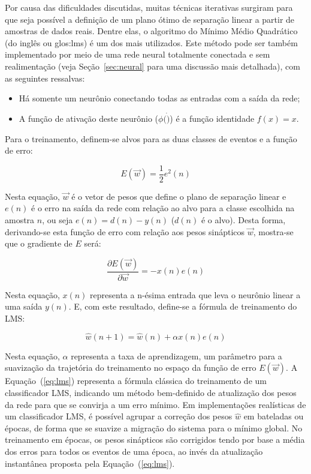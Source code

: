Por causa das dificuldades discutidas, muitas técnicas iterativas surgiram
para que seja possível a definição de um plano ótimo de separação linear a
partir de amostras de dados reais. Dentre elas, o algoritmo do Mínimo Médio
Quadrático \cite{widrow} (do inglês  ou \gls{glos:lms})
é um dos mais utilizados. Este método pode ser também implementado por meio de
uma rede neural totalmente conectada e sem realimentação (veja
Seção~\ref{sec:neural} para uma discussão mais detalhada), com as seguintes
ressalvas:

\begin{itemize}
\item Há somente um neurônio conectando todas as entradas com a saída da rede;
\item A função de ativação deste neurônio ($\phi(\dot)$) é a função identidade
$f(x) = x$.
\end{itemize}

Para o treinamento, definem-se alvos para as duas classes de eventos e a
função de erro:

\begin{equation}
E(\overrightarrow{w}) = \frac{1}{2} e^2(n)
\label{eq:mse-definition}
\end{equation}

Nesta equação, $\overrightarrow{w}$ é o vetor de pesos que define o plano de
separação linear e $e(n)$ é o erro na saída da rede com relação ao alvo para a
classe escolhida na amostra $n$, ou seja $e(n) = d(n)-y(n)$ ($d(n)$ é o
alvo). Desta forma, derivando-se esta função de erro com relação aos pesos
sinápticos $\overrightarrow{w}$, mostra-se que o gradiente de $E$ será:

\begin{equation}
\frac{\partial E(\overrightarrow{w})}{\partial \overrightarrow{w}} =
-x(n)e(n) 
\end{equation}

Nesta equação, $x(n)$ representa a n-ésima entrada que leva o neurônio linear
a uma saída $y(n)$. E, com este resultado, define-se a fórmula de treinamento
do LMS:

\begin{equation}
\hat{w}(n+1) = \hat{w}(n) + \alpha x(n)e(n)
\label{eq:lms}
\end{equation}

Nesta equação, $\alpha$ representa a taxa de aprendizagem, um parâmetro para a
suavização da trajetória do treinamento no espaço da função de erro
$E(\overrightarrow{w})$. A Equação~(\ref{eq:lms}) representa a fórmula
clássica do treinamento de um classificador LMS, indicando um método
bem-definido de atualização dos pesos da rede para que se convirja a um erro
mínimo. Em implementações realísticas de um classificador LMS, é possível
agrupar a correção dos pesos $\hat{w}$ em bateladas ou épocas, de forma que se
suavize a migração do sistema para o mínimo global. No treinamento em épocas,
os pesos sinápticos são corrigidos tendo por base a média dos erros para todos
os eventos de uma época, ao invés da atualização instantânea proposta pela
Equação~(\ref{eq:lms}).

